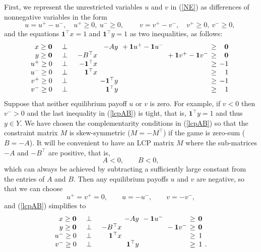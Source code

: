 \documentclass[a4paper,12pt]{article}  %
\theoremstyle{definition}
\newcommand{\T}{^{\top}}
\newcommand{\0}{{\mathbf0}}
\newcommand{\1}{{\mathbf1}}
\begin{document}
First, we represent the unrestricted
variables $u$ and $v$ in (\ref{NE}) as differences of
nonnegative variables in the form
\begin{equation}
\label{uv+-}
u=u^+-u^-,\quad u^+\ge0,~ u^-\ge0,~
\qquad
v=v^+-v^-,\quad v^+\ge0,~ v^-\ge0,~ 
\end{equation}
and the equations $\1\T x=1$ and $\1\T y=1$ as two
inequalities, as follows:
\begin{equation}
\label{lcpAB}
\arraycolsep.2em
\begin{array}{rcrrllcrr}
x\ge\0&\quad\bot\quad&
&-Ay
&
{}+\1u^+-\1u^-
&&\ge&\0
\\
y\ge\0&\quad\bot\quad&
-B\T x&&
&{}+\1v^+-\1v^-
&\ge&\0&
\\
u^+\ge0&\quad\bot\quad&
-\1\T x&&&&\ge&-1
\\
u^-\ge0&\quad\bot\quad&
\1\T x&&&&\ge&1
\\
v^+\ge0&\quad\bot\quad&
&-\1\T y&&&\ge&-1
\\
v^-\ge0&\quad\bot\quad&
&\1\T y&&&\ge&1
\end{array}
\end{equation}
Suppose that neither equilibrium payoff $u$ or $v$ is zero.
For example, if $v<0$ then $v^->0$ and the last inequality
in (\ref{lcpAB}) is tight, that is, $\1\T y=1$ and thus
$y\in Y$.
We have chosen the complementarity conditions in
(\ref{lcpAB}) so that the constraint matrix $M$ is
skew-symmetric ($M=-M\T$) if the game is zero-sum
($B=-A$). 
It will be convenient to have an LCP matrix $M$ where the
sub-matrices $-A$ and $-B\T$ are positive, that is,
\begin{equation}
\label{ABneg}
A<0,\qquad B<0,
\end{equation}
which can always be achieved by subtracting a sufficiently
large constant from the entries of $A$ and $B$.
Then any equilibrium payoffs $u$ and $v$ are negative, so
that we can choose
\begin{equation}
\label{uv-}
u^+=v^+=0,\qquad
u=-u^-,\qquad
v=-v^-,
\end{equation}
and (\ref{lcpAB}) simplifies to
\begin{equation}
\label{lcpAB-}
\arraycolsep.2em
\begin{array}{rcrrllcrr}
x\ge\0&\quad\bot\quad&
&-Ay
&
{}-\1u^-
&&\ge&\0
\\
y\ge\0&\quad\bot\quad&
-B\T x&&
&{}-\1v^-
&\ge&\0&
\\
u^-\ge0&\quad\bot\quad&
\1\T x&&&&\ge&1
\\
v^-\ge0&\quad\bot\quad&
&\1\T y&&&\ge&1&.
\end{array}
\end{equation}
\end{document}
